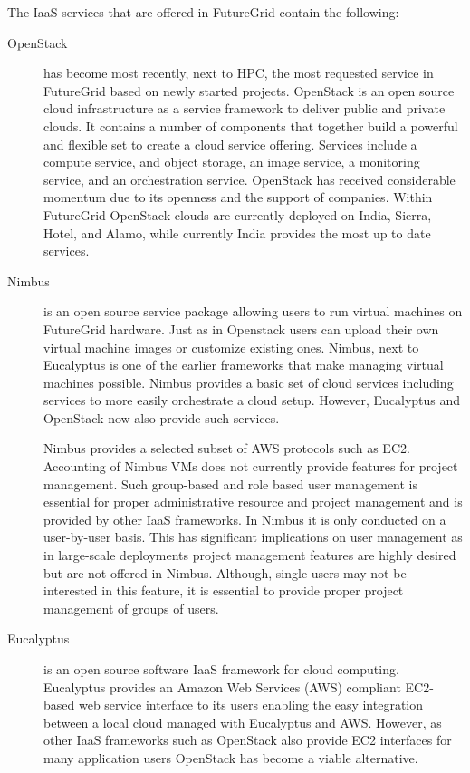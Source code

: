 \documentclass{article}
\begin{document}
The IaaS services that are offered in FutureGrid contain the following:


\begin{description}
\item [OpenStack] has become most recently, next to HPC, the most requested service in FutureGrid based on newly started projects. OpenStack is an open source cloud infrastructure as a service framework to deliver public and private clouds. It contains a number of components that together build a powerful and flexible set to create a cloud service offering. Services include a compute service, and object storage, an image service, a monitoring service, and an orchestration service. OpenStack has received considerable momentum due to its openness and the support of companies. Within FutureGrid OpenStack clouds are currently deployed on India, Sierra, Hotel, and Alamo, while currently India provides the most up to date services.  


\item [Nimbus] is an open source service package allowing users to run virtual machines on FutureGrid hardware. Just as in Openstack users can upload their own virtual machine images or customize existing ones. Nimbus, next to Eucalyptus is one of the earlier frameworks that make managing virtual machines possible. Nimbus provides a basic set of cloud services including services to more easily orchestrate a cloud setup. However, Eucalyptus and OpenStack now also provide such services. 


Nimbus provides a selected subset of AWS protocols such as EC2. Accounting of Nimbus VMs does not currently provide features for project management. Such group-based and role based user management is essential for proper administrative resource and project management and is provided by other IaaS frameworks. In Nimbus it is only conducted on a user-by-user basis. This has significant implications on user management as in large-scale deployments project management features are highly desired but are not offered in Nimbus. Although,  single users may not be interested in this feature, it is essential to provide proper project management of groups of users. 


\item [Eucalyptus] is an open source software IaaS framework for cloud computing. Eucalyptus provides an Amazon Web Services (AWS) compliant EC2-based web service interface to its users enabling the easy integration between a local cloud managed with Eucalyptus and AWS. However, as other IaaS frameworks such as OpenStack also provide EC2 interfaces for many application users OpenStack has become a viable alternative.


\end{description}
\end{document}
